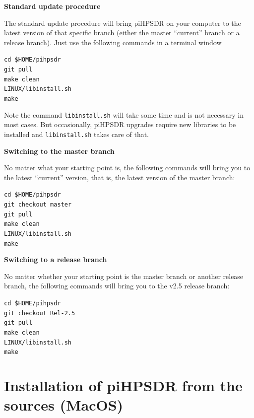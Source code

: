 \documentclass[12pt]{book}
\def\grtt#1{\texttt{\color{magenta}#1}}
\def\pH{pi\-HPSDR\xspace}
\begin{document}
\medskip
\textbf{Standard update procedure}

The standard update procedure will bring \pH on your computer to the latest version of
that specific branch (either the master ``current'' branch or a release branch).
Just use the following commands in a terminal window

\grtt{cd \$HOME/pihpsdr} \\
\grtt{git pull} \\
\grtt{make clean} \\
\grtt{LINUX/libinstall.sh} \\
\grtt{make}

Note the command \texttt{libinstall.sh} will take some time and is not necessary in most cases. But occasionally,
\pH upgrades require new libraries to be installed and \texttt{libinstall.sh} takes care of that.

\medskip
\textbf{Switching to the master branch}

No matter what your starting point is, the following commands will bring you to the
latest ``current'' version, that is, the latest version of the master branch:

\grtt{cd \$HOME/pihpsdr} \\
\grtt{git checkout master} \\
\grtt{git pull} \\
\grtt{make clean} \\
\grtt{LINUX/libinstall.sh} \\
\grtt{make}

\medskip
\textbf{Switching to a release branch}

No matter whether your starting point is the master branch or another release branch, the following
commands will bring you to  the v2.5 release branch:

\grtt{cd \$HOME/pihpsdr} \\
\grtt{git checkout Rel-2.5} \\
\grtt{git pull} \\
\grtt{make clean} \\
\grtt{LINUX/libinstall.sh} \\
\grtt{make}

\chapter[MacOS: \pH install from sources]{Installation of \pH from the sources (MacOS)}
\label{sec:installmacosx}
\end{document}
